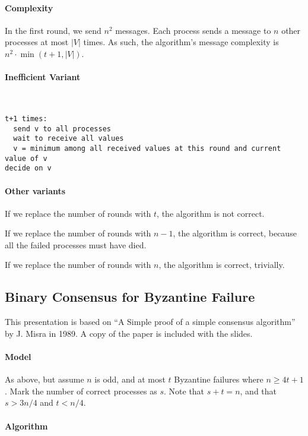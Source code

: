 \documentclass{idc_msc}
\begin{document}
\paragraph{Complexity}
In the first round, we send $n^2$ messages.
Each process sends a message to $n$ other processes at most $|V|$ times.
As such, the algorithm's message complexity is $n^2 \cdot \min(t+1, |V|)$.

\paragraph{Inefficient Variant}\ \\

\begin{lstlisting}[frame=L,mathescape=true,title={Algorithm for process $p_i$ with input $in_i$}]
t+1 times:
  send v to all processes
  wait to receive all values
  v = minimum among all received values at this round and current value of v
decide on v
\end{lstlisting}

\paragraph{Other variants}

If we replace the number of rounds with $t$, the algorithm is not correct.

If we replace the number of rounds with $n-1$, the algorithm is correct, because all the failed processes must have died.

If we replace the number of rounds with $n$, the algorithm is correct, trivially.

\clearpage
\subsection{Binary Consensus for Byzantine Failure}

This presentation is based on ``A Simple proof of a simple consensus algorithm'' by J. Misra in 1989. A copy of the paper is included with the slides.

\paragraph{Model}
As above, but assume $n$ is odd, and at most $t$ Byzantine failures where $n \ge 4t + 1$.
Mark the number of correct processes as $s$. Note that $s + t = n$, and that $s > 3n/4$ and $t < n/4$.

\paragraph{Algorithm}\ \\
\end{document}
